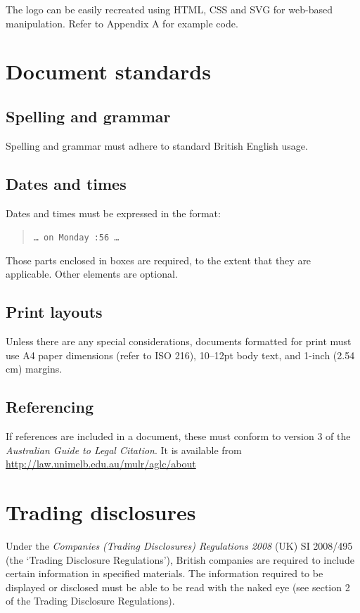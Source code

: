 \documentclass[a4paper,10pt]{article}
\begin{document}
The logo can be easily recreated using HTML, CSS and SVG for web-based manipulation. Refer to Appendix A for example code.

\section{Document standards}

\subsection{Spelling and grammar}

Spelling and grammar must adhere to standard British English usage.

\subsection{Dates and times}

Dates and times must be expressed in the format:

\begin{quote}
  \texttt{\ldots{} on Monday :56  \ldots}
\end{quote}

Those parts enclosed in boxes are required, to the extent that they are applicable. Other elements are optional.

\subsection{Print layouts}

Unless there are any special considerations, documents formatted for print must use A4 paper dimensions (refer to ISO 216), 10--12pt body text, and 1-inch (2.54 cm) margins.

\subsection{Referencing}

If references are included in a document, these must conform to version 3 of the \textit{Australian Guide to Legal Citation}. It is available from \url{http://law.unimelb.edu.au/mulr/aglc/about}

\section{Trading disclosures}

Under the \textit{Companies (Trading Disclosures) Regulations 2008} (UK) SI 2008/495 (the `Trading Disclosure Regulations'), British companies are required to include certain information in specified materials. The information required to be displayed or disclosed must be able to be read with the naked eye (see section 2 of the Trading Disclosure Regulations).
\end{document}
